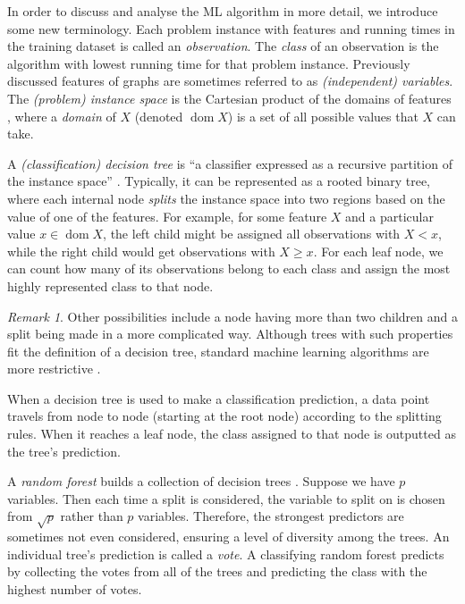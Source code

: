 \documentclass{l4proj}
\theoremstyle{definition}
\theoremstyle{remark}
\newtheorem{remark}{Remark}[section]
\DeclareMathOperator{\dom}{dom}
\begin{document}
In order to discuss and analyse the ML algorithm in more detail, we introduce
some new terminology. Each problem instance with features and running times in
the training dataset is called an \emph{observation}. The \emph{class} of an
observation is the algorithm with lowest running time for that problem instance.
Previously discussed features of graphs are sometimes referred to as
\emph{(independent) variables}. The \emph{(problem) instance space} is the
Cartesian product of the domains of features \cite{DBLP:series/smpai/RokachM14},
where a \emph{domain} of $X$ (denoted $\dom X$) is a set of all possible values
that $X$ can take.

A \emph{(classification) decision tree} is ``a classifier expressed as a
recursive partition of the instance space'' \cite{DBLP:series/smpai/RokachM14}.
Typically, it can be represented as a rooted binary tree, where each internal
node \emph{splits} the instance space into two regions based on the value of one
of the features. For example, for some feature $X$ and a particular value $x \in
\dom{X}$, the left child might be assigned all observations with $X < x$, while
the right child would get observations with $X \ge x$. For each leaf node, we
can count how many of its observations belong to each class and assign the most
highly represented class to that node.

\begin{remark}
  Other possibilities include a node having more than two children and a split
  being made in a more complicated way. Although trees with such properties fit
  the definition of a decision tree, standard machine learning algorithms are
  more restrictive \cite{James:2014:ISL:2517747, DBLP:series/smpai/RokachM14}.
\end{remark}

When a decision tree is used to make a classification prediction, a data point
travels from node to node (starting at the root node) according to the splitting
rules. When it reaches a leaf node, the class assigned to that node is outputted
as the tree's prediction.

A \emph{random forest} builds a collection of decision trees
\cite{James:2014:ISL:2517747}. Suppose we have $p$ variables. Then each time a
split is considered, the variable to split on is chosen from $\sqrt{p}$ rather
than $p$ variables. Therefore, the strongest predictors are sometimes not even
considered, ensuring a level of diversity among the trees. An individual tree's
prediction is called a \emph{vote}. A classifying random forest predicts by
collecting the votes from all of the trees and predicting the class with the
highest number of votes.
\end{document}
